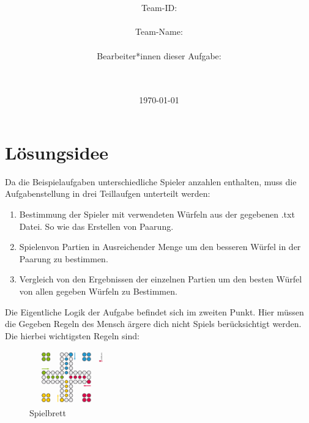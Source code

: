 \documentclass[a4paper,10pt,ngerman]{scrartcl}
\title{\textbf{\Huge\Aufgabe}}
\author{\LARGE Team-ID: \LARGE \TeamId \\\\
	    \LARGE Team-Name: \LARGE \TeamName \\\\
	    \LARGE Bearbeiter*innen dieser Aufgabe: \\ 
	    \LARGE \Namen\\\\}
\date{\LARGE\today}
\begin{document}
\maketitle
\tableofcontents

\vspace{0.5cm}


\section{Lösungsidee}

Da die Beispielaufgaben unterschiedliche Spieler anzahlen enthalten, muss die Aufgabenstellung in drei Teillaufgen unterteilt werden:
\begin{enumerate}
	\item Bestimmung der Spieler mit verwendeten Würfeln aus der gegebenen .txt Datei. So wie das Erstellen von Paarung.
	\item \glqq Spielen\grqq von Partien in Ausreichender Menge um den besseren Würfel in der Paarung zu bestimmen.
	\item Vergleich von den Ergebnissen der einzelnen Partien um den besten Würfel von allen gegeben Würfeln zu Bestimmen.
\end{enumerate}
Die Eigentliche Logik der Aufgabe befindet sich im zweiten Punkt. Hier müssen die Gegeben Regeln des Mensch ärgere dich nicht Spiels berücksichtigt werden. Die hierbei wichtigsten Regeln sind:
\begin{figure} 
	\includegraphics[width=0.31\textwidth]{mensch-aergere-dich-nicht-spielfeld}
	\centering
	\caption{Spielbrett}
\end{figure}
\end{document}
